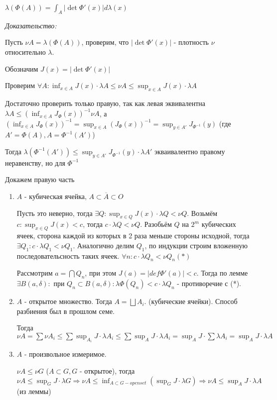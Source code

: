 \documentclass[paper=a4, fontsize=14pt]{report}
\begin{document}
$\lambda(\Phi(A)) = \int_A |\det \Phi' (x)| d \lambda(x)$


\emph{Доказательство:}

Пусть $\nu A = \lambda(\Phi(A))$, проверим, что $|\det \Phi' (x)|$ - плотность $\nu$ относительно $\lambda$.

Обозначим $J(x) = |\det \Phi' (x)|$

Проверим $\forall A: \inf_{x \in A} J(x) \cdot \lambda A \leqslant \nu A \leqslant \sup_{x \in A} J(x) \cdot \lambda A$

Достаточно проверить только правую, так как левая эквивалентна $\lambda A \leqslant (\inf_{x \in A} J_{\Phi}(x))^{-1} \nu A$, а $(\inf_{x \in A} J_{\Phi}(x))^{-1} = \sup_{x \in A} (J_{\Phi}(x))^{-1} = \sup_{y \in A'} J_{\Phi^{-1}}(y)$ (где $A' = \Phi(A), A = \Phi^{-1}(A')$)

Тогда $\lambda(\Phi^{-1}(A')) \leqslant \sup_{y \in A'} J_{\Phi^{-1}}(y) \cdot \lambda A'$ экваивалентно правому неравенству, но для $\Phi^{-1}$

Докажем правую часть

\begin{enumerate}
	\item $A$ - кубическая ячейка, $A \subset \overline{A} \subset O$
	
	Пусть это неверно, тогда $\exists Q: \sup_{x \in Q} J(x) \cdot \lambda Q < \nu Q$. Возьмём $c:  \sup_{x \in Q} J(x) < c$, тогда $c \cdot \lambda Q < \nu Q$. Разобьём $Q$ на $2^m$ кубических ячеек, сторона каждой из которых в 2 раза меньше стороны исходной, тогда $\exists Q_1: c \cdot \lambda Q_1 < \nu Q_1$. Аналогично делим $Q_1$, по индукции строим вложенную последовательсность таких ячеек. $\forall n: c \cdot \lambda Q_n < \nu Q_n (*)$
	
	Рассмотрим $a = \bigcap Q_n$, при этом $J(a) = |def \Phi'(a)| < c$. Тогда по лемме $\exists B(a, \delta):$ при $Q_n \subset B(a, \delta): \lambda \Phi(Q_n) < c \cdot \lambda Q_n$ - противоречие с (*).
	
	\item $A$ - открытое множество. Тогда $A = \bigsqcup A_i$. (кубические ячейки). Способ разбиения был в прошлом семе.
	
	Тогда $\nu A = \sum \nu A_i \leqslant \sum \sup_{A_i} J \cdot  \lambda A_i \leqslant \sum \sup_{A} J \cdot \lambda A_i = \sup_{A} J \cdot \sum \lambda A_i = \sup_{A} J \cdot  \lambda A$ 
	
	\item $A$ - произвольное измеримое.
	
	$\nu A \leqslant \nu G$ ($A \subset G, G$ - открытое), тогда $\nu A \leqslant \sup_G J \cdot \lambda G \Rightarrow \nu A \leqslant \inf_{A \subset G - open set}(\sup_G J \cdot \lambda G) \Rightarrow \nu A \leqslant \sup_A J \cdot \lambda A$ (из леммы)
	
\end{enumerate}
\end{document}
